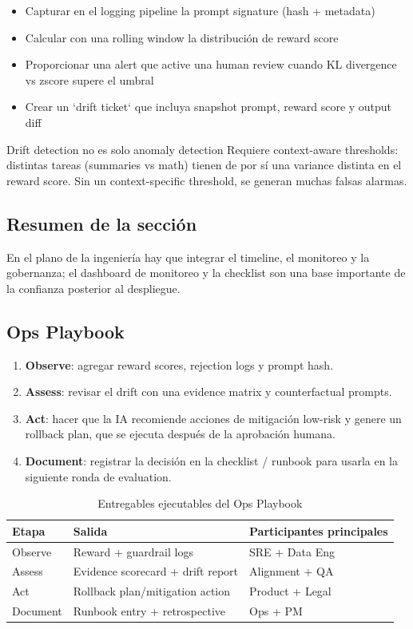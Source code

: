 \begin{itemize}
    \item Capturar en el logging pipeline la prompt signature (hash + metadata)
    \item Calcular con una rolling window la distribución de reward score
    \item Proporcionar una alert que active una human review cuando KL divergence vs zscore supere el umbral
    \item Crear un `drift ticket` que incluya snapshot prompt, reward score y output diff
\end{itemize}

\begin{knowledgebox}{Drift detection no es solo anomaly detection}
Requiere context-aware thresholds: distintas tareas (summaries vs math) tienen de por sí una variance distinta en el reward score. Sin un context-specific threshold, se generan muchas falsas alarmas.
\end{knowledgebox}

\subsection{Resumen de la sección}

En el plano de la ingeniería hay que integrar el timeline, el monitoreo y la gobernanza; el dashboard de monitoreo y la checklist son una base importante de la confianza posterior al despliegue.
\subsection{Ops Playbook}

\begin{enumerate}
    \item \textbf{Observe}: agregar reward scores, rejection logs y prompt hash.
    \item \textbf{Assess}: revisar el drift con una evidence matrix y counterfactual prompts.
    \item \textbf{Act}: hacer que la IA recomiende acciones de mitigación low-risk y genere un rollback plan, que se ejecuta después de la aprobación humana.
    \item \textbf{Document}: registrar la decisión en la checklist / runbook para usarla en la siguiente ronda de evaluation.
\end{enumerate}

\begin{table}[H]
\centering
\begin{tabular}{p{} p{} p{}}
\toprule
Etapa & Salida & Participantes principales \\
\midrule
Observe & Reward + guardrail logs & SRE + Data Eng \\
Assess & Evidence scorecard + drift report & Alignment + QA \\
Act & Rollback plan/mitigation action & Product + Legal \\
Document & Runbook entry + retrospective & Ops + PM \\
\bottomrule
\end{tabular}
\caption{Entregables ejecutables del Ops Playbook}
\end{table}

